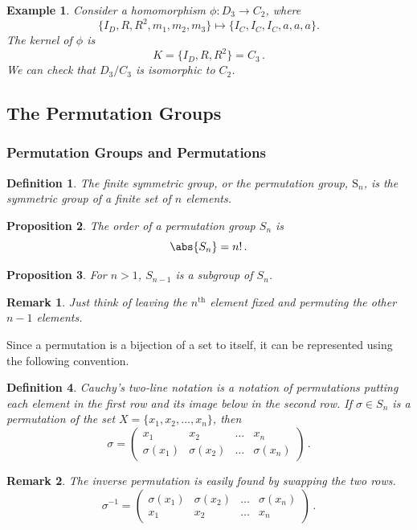 \documentclass{article}
\theoremstyle{plain}\theoremheaderfont{\normalfont\itshape}\theorembodyfont{\rmfamily}\theoremseparator{.}\newtheorem*{rem}{Remark}\newtheorem*{ex}{Example}\newtheorem*{proof}{Proof}\newtheorem*{altp}{Alternative proof}
\theoremstyle{plain}\theoremheaderfont{\normalfont\bfseries}\theorembodyfont{\rmfamily}\theoremseparator{.}\newtheorem{thm}{Theorem}[section]\newtheorem{lem}[thm]{Lemma}\newtheorem{prop}[thm]{Proposition}\newtheorem*{cor}{Corollary}\newtheorem{defn}[thm]{Definition}\newtheorem{clm}[thm]{Claim}\newtheorem{clminproof}{Claim}
\theoremstyle{break}\theoremheaderfont{\normalfont\itshape}\theorembodyfont{\rmfamily}\theoremseparator{.\medskip}\newtheorem*{proofskip}{Proof}\newtheorem*{exs}{Examples}\newtheorem*{rems}{Remarks}
\theoremstyle{break}\theoremheaderfont{\normalfont\bfseries}\theorembodyfont{\rmfamily}\theoremseparator{.\medskip}\newtheorem{lemskip}[thm]{Lemma}\newtheorem{defnskip}[thm]{Definition}\newtheorem{propskip}[thm]{Proposition}\newtheorem{thmskip}[thm]{Theorem}
\numberwithin{equation}{section}
\begin{document}
	\begin{ex}
		Consider a homomorphism \(\phi: D_3\to C_2\), where
		\[\{I_D,R,R^2,m_1,m_2,m_3\}\mapsto\{I_C,I_C,I_C,a,a,a\}.\]
		The kernel of \(\phi\) is
		\[K=\{I_D,R,R^2\}=C_3\,.\]
		We can check that \(D_3/C_3\) is isomorphic to \(C_2\).
	\end{ex}

	\subsection{The Permutation Groups}
	\subsubsection{Permutation Groups and Permutations}
	\begin{defn}	
		The \textit{finite symmetric group}, or the \textit{permutation group}, \(\mathrm{S}_{n}\), is the symmetric group of a finite set of \(n\) elements.
	\end{defn}
	\begin{prop}
		The order of a permutation group \(S_n\) is
		\[\abs{S_n}=n!\,.\]
	\end{prop}
	\begin{prop}
		For \(n>1\), \(S_{n-1}\) is a subgroup of \(S_n\).
	\end{prop}
	\begin{rem}
		Just think of leaving the \(n^{\text{th}}\) element fixed and permuting the other \(n-1\) elements.
	\end{rem}
	Since a permutation is a bijection of a set to itself, it can be represented using the following convention.
	\begin{defn}
		\textit{Cauchy's two-line notation} is a notation of permutations putting each element in the first row and its image below in the second row. If \(\sigma\in S_n\) is a permutation of the set \(X=\{x_1,x_2,...,x_n\}\), then
		\[\sigma=\begin{pmatrix}
			x_1 & x_2 & \dots & x_n\\
			\sigma(x_1) & \sigma(x_2) & \dots & \sigma(x_n)
		\end{pmatrix}\,.\]
	\end{defn}
	\begin{rem}
		The inverse permutation is easily found by swapping the two rows.
		\[\sigma^{-1}=\begin{pmatrix}
			\sigma(x_1) & \sigma(x_2) & \dots & \sigma(x_n)\\
			x_1 & x_2 & \dots & x_n
		\end{pmatrix}\,.\]
	\end{rem}
\end{document}
